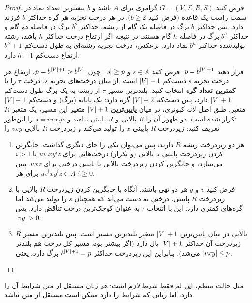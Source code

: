 \begin{proof}
فرض کنید $G=(V,\Sigma,R,S)$ گرامری برای $A$ باشد و $b$ بیشترین تعداد نماد در سمت راست یک قاعده (فرض کنید $b\ge2$). در هر درخت تجزیه هر گره حداکثر $b$ فرزند دارد. پس حداکثر $b$ برگ در فاصله یک گام از ریشه، حداکثر $b^2$ برگ در فاصله دو گام و حداکثر $b^h$ برگ در فاصله $h$ گام هستند. در نتیجه اگر ارتفاع درخت حداکثر $h$ باشد، رشته تولیدشده حداکثر $b^h$ نماد دارد. برعکس، درخت تجزیه رشته‌ای به طول دست‌کم $b^h+1$ ارتفاع دست‌کم $h+1$ دارد.

قرار دهید $p=b^{\lvert V\rvert+1}$. فرض کنید $s\in A$ و $\lvert s\rvert\ge p$. چون $p=b^{\lvert V\rvert+1}>b^{\lvert V\rvert}$، ارتفاع هر درخت تجزیه $s$ دست‌کم $\lvert V\rvert+1$ است. از میان درخت‌های تجزیه $s$، درخت $\tau$ را با \textbf{کمترین تعداد گره} انتخاب کنید. بلندترین مسیر $\tau$ از ریشه به یک برگ طول دست‌کم $\lvert V\rvert+1$ دارد، پس دست‌کم $\lvert V\rvert+2$ گره دارد: یک پایانه (برگ) و دست‌کم $\lvert V\rvert+1$ متغیر. طبق اصل لانه کبوتری، در میان \textbf{پایین‌ترین} $\lvert V\rvert+1$ متغیر این مسیر، یک متغیر $R$ تکرار شده است. دو ظهور آن را $R$ بالایی و $R$ پایینی بنامید و $s=uvxyz$ را این‌طور تعریف کنید: زیردرخت $R$ پایینی $x$ را تولید می‌کند و زیردرخت $R$ بالایی $vxy$ را.

\begin{enumerate}
\item هر دو زیردرخت ریشه $R$ دارند، پس می‌توان یکی را جای دیگری گذاشت. جایگزین کردن زیردرخت پایینی با بالایی (و تکرار) درخت‌هایی برای $uv^ixy^iz$ با $i>1$ می‌سازد، و جایگزین کردن زیردرخت بالایی با پایینی درختی برای $uxz$. پس $uv^ixy^iz\in A$ برای هر $i\ge0$.
\item فرض کنید $v$ و $y$ هر دو تهی باشند. آنگاه با جایگزین کردن زیردرخت $R$ بالایی با زیردرخت $R$ پایینی، درختی به دست می‌آید که همچنان $s$ را تولید می‌کند اما گره‌های کمتری دارد. این با انتخاب $\tau$ به عنوان کوچک‌ترین درخت تناقض دارد. پس $\lvert vy\rvert>0$.
\item $R$ بالایی در میان پایین‌ترین $\lvert V\rvert+1$ متغیر بلندترین مسیر است. پس بلندترین مسیر زیردرخت آن حداکثر $\lvert V\rvert+1$ یال دارد (اگر بیشتر بود، مسیر کل درخت هم بلندتر می‌شد). بنابراین این زیردرخت حداکثر $b^{\lvert V\rvert+1}=p$ برگ دارد، یعنی $\lvert vxy\rvert\le p$.\qedhere
\end{enumerate}
\end{proof}

\begin{warning}
مثل حالت منظم، این لم فقط شرط \emph{لازم} است: هر زبان مستقل از متن شرایط آن را دارد، اما زبانی که شرایط را دارد ممکن است مستقل از متن نباشد.
\end{warning}

